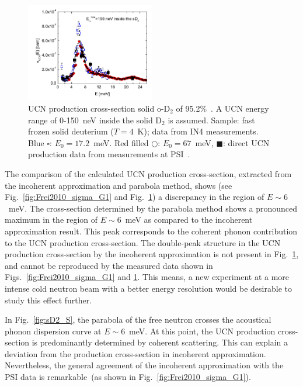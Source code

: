 \begin{figure}[h!]
\begin{center}
  \includegraphics[width=0.5\textwidth]{Frei2010_sigma.PNG} \caption{\cite{Frei2010}
    UCN production cross-section solid o-D$_2$ of
    95.2\%~\cite{Frei2010}. A UCN energy range of 0-150~neV inside the
    solid D$_2$ is assumed. Sample: fast frozen solid deuterium
    ($T=4$~K); data from IN4 measurements. Blue $\square$:
    $E_0=17.2$~meV. Red filled $\bigcirc$: $E_0=67$~meV,
    $\blacksquare$: direct UCN production data from measurements at
    PSI~\cite{Atchison2007}.  }
    \label{fig:Frei2010fig2}
    \end{center}
\end{figure} 

The comparison of the calculated UCN production cross-section,
extracted from the incoherent approximation and parabola method, shows
(see Fig.~\ref{fig:Frei2010_sigma_G1} and Fig.~\ref{fig:Frei2010fig2})
a discrepancy in the region of $E\sim6$~meV.  The cross-section
determined by the parabola method shows a pronounced maximum in the
region of $E\sim6$~meV as compared to the incoherent approximation
result. This peak corresponds to the coherent phonon contribution to
the UCN production cross-section. The double-peak structure in the UCN
production cross-section by the incoherent approximation is not
present in Fig.~\ref{fig:Frei2010fig2}, and cannot be reproduced by the
measured data shown in Figs.~\ref{fig:Frei2010_sigma_G1}
and \ref{fig:Frei2010fig2}.  This means, a new experiment at a more
intense cold neutron beam with a better energy resolution would be
desirable to study this effect further.

In Fig.~\ref{fig:sD2_S}, the parabola of the free neutron crosses the
acoustical phonon dispersion curve at $E \sim 6$~meV. At this point,
the UCN production cross-section is predominantly determined by
coherent scattering.  This can explain a deviation from the production
cross-section in incoherent approximation. Nevertheless, the general
agreement of the incoherent approximation with the PSI data is
remarkable~(as shown in Fig.~\ref{fig:Frei2010_sigma_G1}).


